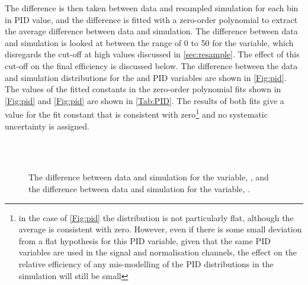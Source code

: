 The difference is then taken between data and resampled simulation for each bin in PID value, and the difference is fitted with a zero-order polynomial to extract the average difference between data and simulation. The difference between data and simulation is looked at between the range of 0 to 50 for the \dllppi variable, which disregards the cut-off at high \dllppi values discussed in \autoref{sec:resample}. The effect of this cut-off on the final efficiency is discussed below.  The difference between the data and simulation distributions for the \dllppi and \dllkpi PID variables are shown in \autoref{Fig:pid}. The values of the fitted constants in the zero-order polynomial fits shown in \autoref{Fig:pid}\protect{} and \autoref{Fig:pid}\protect{} are shown in \autoref{Tab:PID}. The results of both fits give a value for the fit constant that is consistent with zero\footnote{in the case of \autoref{Fig:pid}\protect{} the distribution is not particularly flat, although the average is consistent with zero. However, even if there is some small deviation from a flat hypothesis for this PID variable, given that the same PID variables are used in the signal and normalisation channels, the effect on the relative efficiency of any mis-modelling of the PID distributions in the simulation will still be small} and no systematic uncertainty is assigned.    %

\begin{figure}[h!]
  \def\nh{0.7\textwidth}
  \centering

   \\
  \\%
  \caption{The difference between data and simulation for the \dllkpi variable, \protect{}, and the difference between data and simulation for the \dllppi variable, \protect{}.}
  \label{Fig:pid}
\end{figure}

